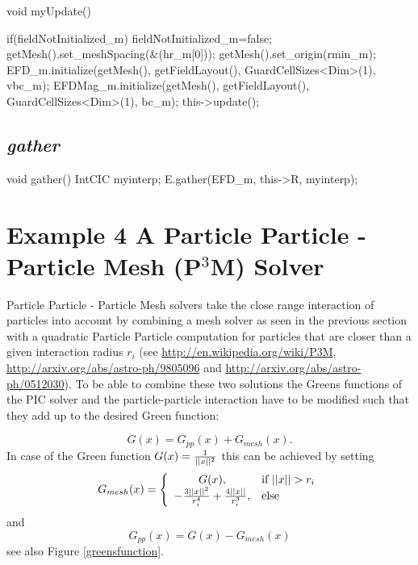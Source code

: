  \begin{code}
void myUpdate() {

    if(fieldNotInitialized_m) {
         fieldNotInitialized_m=false;
         getMesh().set_meshSpacing(&(hr_m[0]));
         getMesh().set_origin(rmin_m);
         EFD_m.initialize(getMesh(), getFieldLayout(), GuardCellSizes<Dim>(1), vbc_m);
         EFDMag_m.initialize(getMesh(), getFieldLayout(), GuardCellSizes<Dim>(1), bc_m);
    }
    this->update();
}
\end{code}

  \subsection{{\em gather}}

\begin{code}
void gather() {
    IntCIC myinterp;
    E.gather(EFD_m, this->R, myinterp);
}
\end{code}

 \section{Example 4 A Particle Particle - Particle Mesh (P$^3$M) Solver}
 Particle Particle - Particle Mesh solvers take the close range interaction of particles
into account by combining a mesh solver as seen in the previous section with a quadratic
Particle Particle computation for particles that are closer than a given interaction
radius $r_i$ (see \url{http://en.wikipedia.org/wiki/P3M},
\url{http://arxiv.org/abs/astro-ph/9805096} and \url{http://arxiv.org/abs/astro-ph/0512030}).
To be able to combine these two solutions the Greens functions of the PIC solver and the
particle-particle interaction have to be modified such that they add up to the desired
Green function:

\begin{equation}
G(x) = G_{pp}(x) + G_{mesh}(x).
\end{equation}
In case of the Green function $G(x) = {1 \over ||x||^2}$ this can be achieved by setting
\begin{equation}
G_{mesh}(x) = \left\{\begin{array}{cl} G(x), & \mbox{if } ||x||>r_i\\ -{3||x||^2\over r_i^4} + {4||x||\over r_i^3}, & \mbox{else} \end{array}\right.
\end{equation}
and
\begin{equation}
G_{pp}(x) = G(x) - G_{mesh}(x)
\end{equation}
see also Figure \ref{greensfunction}.

